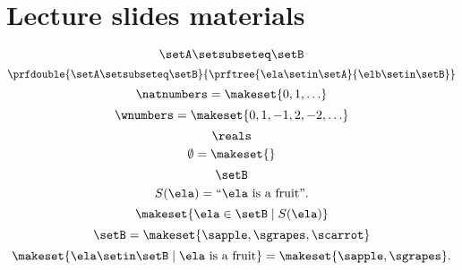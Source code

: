 
\section{Lecture slides materials}

\begin{forslides}
    \begin{equation}
        \label{eq:subset_session1_22}
        \setA \setsubseteq \setB
    \end{equation}
    \begin{equation}
        \label{eq:subset_2_session1_22}
        \prfdouble{\setA \setsubseteq \setB}{\prftree{\ela \setin \setA}{\elb \setin \setB}}
    \end{equation}
    \begin{equation}
        \label{eq:nats_session1_22}
        \natnumbers =\makeset{0,1,\ldots}
    \end{equation}
    \begin{equation}
        \label{eq:reals_session1_22}
        \wnumbers =\makeset{0,1,-1,2,-2,\ldots}
    \end{equation}
    \begin{equation}
        \label{eq:reals_2_session1_22}
        \reals
    \end{equation}
    \begin{equation}
        \label{eq:emptyset_session1_22}
        \emptyset=\makeset{}
    \end{equation}
    \begin{equation}
        \label{eq:stat_1_session1_22}
        \setB
    \end{equation}
    \begin{equation}
        \label{eq:stat_2_session1_22}
        S(\ela) = \text{``$\ela$ is a fruit''}.
    \end{equation}
    \begin{equation}
        \label{eq:stat_3_session1_22}
        \makeset{\ela \in \setB \mid S(\ela)}
    \end{equation}
    \begin{equation}
        \label{eq:stat_4_session1_22}
        \setB=\makeset{\sapple, \sgrapes, \scarrot}
    \end{equation}
    \begin{equation}
        \label{eq:stat_5_session1_22}
        \makeset{ \ela \setin\setB \mid \ela \text{ is a fruit} } = \makeset{ \sapple, \sgrapes }.
    \end{equation}

\end{forslides}
